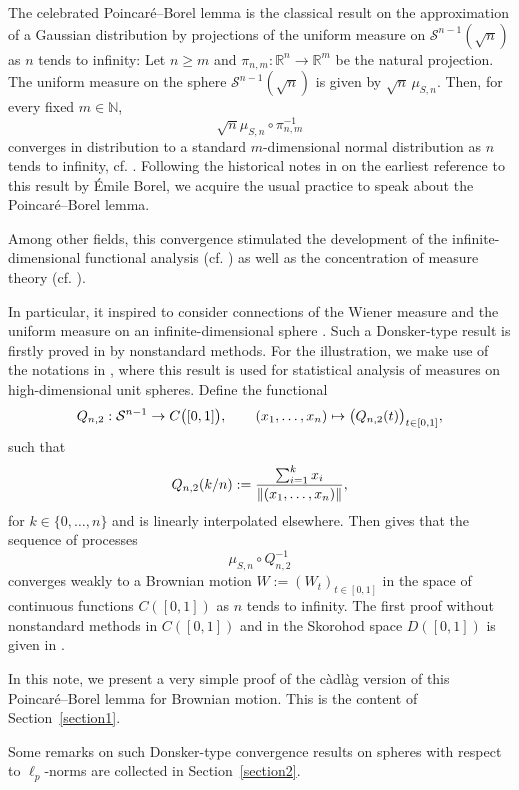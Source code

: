 \documentclass[numbers,compress,v1.0.1]{vmsta}
\theoremstyle{definition}
\def\N{\mathbb{N}}
\def\R{\mathbb{R}}
\newcommand\cadlag{c\`adl\`ag }
\begin{document}
The celebrated Poincar\'{e}--Borel lemma is the classical result on the
approximation of a Gaussian distribution by projections of the uniform
measure on $\mathcal{S}^{n-1}(\sqrt{n})$ as $n$ tends to infinity: Let
$n \geq m$ and $\pi_{n,m}: \R^n \rightarrow\R^m$ be the natural
projection. The uniform measure on the sphere $\mathcal{S}^{n-1}(\sqrt
{n})$ is given by $\sqrt{n}\,\mu_{S,n}$. Then, for every fixed $m \in\N$,
%
\[
\sqrt{n}\mu_{S,n} \circ\pi_{n,m}^{-1}
\]
%
converges in distribution to a standard $m$-dimensional normal
distribution as $n$ tends to infinity, cf. \cite[Proposition~6.1]{Lifshits}. Following the historical notes in \cite[Section~6]{Diaconis} on the earliest reference to this result by \'Emile Borel,
we acquire the usual practice to speak about the Poincar\'{e}--Borel lemma.

Among other fields, this convergence stimulated the development of the
infinite-dimensional functional analysis (cf. \cite{McKean}) as well as
the concentration of measure theory (cf. \cite[Section~1.1]{LedouxTalagrand}).

In particular, it inspired to consider connections of the Wiener
measure and the uniform measure on an infinite-dimensional sphere \cite{Wiener}. Such a Donsker-type result is firstly proved in \cite{Cutland_Ng} by nonstandard methods. For the illustration, we make use
of the notations in \cite{Dryden}, where this result is used for
statistical analysis of measures on high-dimensional unit spheres.
Define the functional
%
\[
Q_{n,2}:\mathcal{S}^{n-1} \rightarrow C\bigl([0,1]\bigr), \qquad (x_1,\ldots, x_n) \mapsto
\xch{\bigl(Q_{n,2}(t) \bigr)_{t \in[0,1]},}{\bigl(Q_{n,2}(t) \bigr)_{t \in[0,1]}}
\]
%
such that
%
\[
Q_{n,2}(k/n) := \xch{\frac{\sum_{i=1}^{k} x_i}{\|(x_1,\ldots, x_n)\|},}{\frac{\sum_{i=1}^{k} x_i}{\|(x_1,\ldots, x_n)\|}}
\]
%
for $k \in\{0,\ldots, n\}$ and is linearly interpolated elsewhere.
Then \cite[Theorem~2.4]{Cutland_Ng} gives that the sequence of processes
%
\[
\mu_{S,n} \circ Q_{n,2}^{-1}
\]
%
converges weakly to a Brownian motion $W := (W_t)_{t \in[0,1]}$ in the
space of continuous functions $C([0,1])$ as $n$ tends to infinity. The
first proof without nonstandard methods in $C([0,1])$ and in the
Skorohod space $D([0,1])$ is given in \cite{Rackauskas}.

In this note, we present a very simple proof of the \cadlag version of
this Poincar\'{e}--Borel lemma for Brownian motion. This is the content
of Section~\ref{section1}.

Some remarks on such Donsker-type convergence results on spheres with
respect to $\ell_p$-norms are collected in Section~\ref{section2}.
\end{document}
